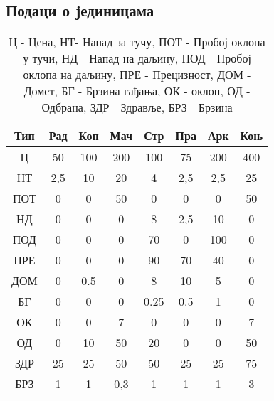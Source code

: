 \documentclass[11pt,a4paper]{report}
\begin{document}
\begin{table}[h]
\subsection{Подаци о јединицама}
\centering
\begin{tabular}{|| c || c | c | c | c | c | c | c ||}
\hline
Тип & Рад & Коп & Мач & Стр & Пра & Арк & Коњ \\
\hline\hline
Ц & 50 & 100 & 200 & 100 & 75 & 200 & 400\\
\hline
НТ & 2,5 & 10 & 20 & 4 & 2,5 & 2,5 & 25\\
\hline
ПОТ & 0 & 0 & 50 & 0 & 0 & 0 & 50\\
\hline
НД & 0 & 0 & 0 & 8 & 2,5 & 10 & 0\\
\hline
ПОД & 0 & 0 & 0 & 70 & 0 & 100 & 0\\
\hline
ПРЕ & 0 & 0 & 0 & 90 & 70 & 40 & 0\\
\hline
ДОМ & 0 & 0.5 & 0 & 8 & 10 & 5 & 0\\
\hline
БГ & 0 & 0 & 0 & 0.25 & 0.5 & 1 & 0\\
\hline
ОК & 0 & 0 & 7 & 0 & 0 & 0 & 7\\
\hline
ОД & 0 & 10 & 50 & 20 & 0 & 0 & 50\\
\hline
ЗДР & 25 & 25 & 50 & 50 & 25 & 25 & 75\\
\hline
БРЗ & 1 & 1 & 0,3 & 1 & 1 & 1 & 3 \\
\hline

\end{tabular}
\caption{Ц - Цена, НТ- Напад за тучу, ПОТ - Пробој оклопа у тучи, НД - Напад на даљину, ПОД - Пробој оклопа на даљину, ПРЕ - Прецизност, ДОМ - Домет, БГ - Брзина гађања, ОК - оклоп, ОД - Одбрана, ЗДР - Здравље, БРЗ - Брзина }
\end{table}
\FloatBarrier
\end{document}

